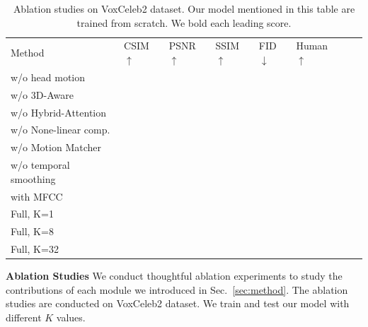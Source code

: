 \documentclass[runningheads]{llncs}
\begin{document}

\begin{table}[t]
    \centering
  \begin{tabular*}{0.9\linewidth}{  p{4.2cm} | p{1.0cm} p{1.0cm} p{1.0cm} p{1.0cm} p{1.0cm} p{1.0cm} p{1.0cm}}
      \toprule
      \midrule
Method & {CSIM$\uparrow$} &{PSNR$\uparrow$} &{SSIM$\uparrow$}&{FID$\downarrow$} &{Human$\uparrow$}  \\ %
{w/o head motion } & \textbf{ } &  &\bf{}  \\ %
{w/o 3D-Aware} & \textbf{ } &  &\bf{}  \\ %
{w/o Hybrid-Attention} & \textbf{ } &  &\bf{}  \\ %
{w/o None-linear comp.} & \textbf{ } &  &\bf{}  \\ %
{w/o Motion Matcher}  &     &     &     \\ %
{w/o temporal smoothing}  &     &     &     \\ %

{with MFCC} & {     } & \bf{     } &  {     } \\ \bottomrule
{Full, K=1} & \textbf{     } & \textbf{     } &  \textbf{     }\\ %
{Full, K=8} & \textbf{     } & \textbf{     } &  \textbf{     }\\ %
{Full, K=32} & \textbf{     } & \textbf{     } &  \textbf{     }\\ %
    \bottomrule
  \end{tabular*}
  \caption{Ablation studies on VoxCeleb2 dataset. Our model mentioned in this table are trained from scratch. We bold each leading score.}
    \label{tab:alation}
\end{table}
\noindent \textbf{Ablation Studies} \quad We conduct thoughtful ablation experiments to study the contributions of each module we introduced in Sec.~\ref{sec:method}. The ablation studies are conducted on VoxCeleb2 dataset. We train and test our model with different $K$ values.
\end{document}
